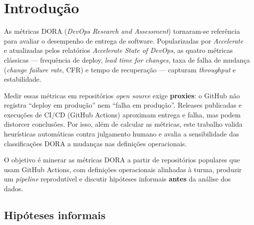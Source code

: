 
\section{Introdução}

As métricas DORA (\textit{DevOps Research and Assessment}) tornaram-se referência
para avaliar o desempenho de entrega de software. Popularizadas por
\textit{Accelerate}~\cite{forsgren2018accelerate} e atualizadas pelos relatórios
\textit{Accelerate State of DevOps}, as quatro métricas clássicas --- frequência
de deploy, \textit{lead time for changes}, taxa de falha de mudança
(\textit{change failure rate}, CFR) e tempo de recuperação --- capturam
\textit{throughput} e estabilidade.

Medir essas métricas em repositórios \textit{open source} exige
\textbf{proxies}: o GitHub não registra ``deploy em produção'' nem ``falha em
produção''. Releases publicadas e execuções de CI/CD (GitHub Actions) aproximam
entrega e falha, mas podem distorcer conclusões. Por isso, além de calcular as
métricas, este trabalho valida heurísticas automáticas contra julgamento humano
e avalia a sensibilidade das classificações DORA a mudanças nas definições
operacionais.

O objetivo é minerar as métricas DORA a partir de repositórios populares que
usam GitHub Actions, com definições operacionais alinhadas à turma, produzir um
\textit{pipeline} reprodutível e discutir hipóteses informais \textbf{antes} da
análise dos dados.

\subsection*{Hipóteses informais}

